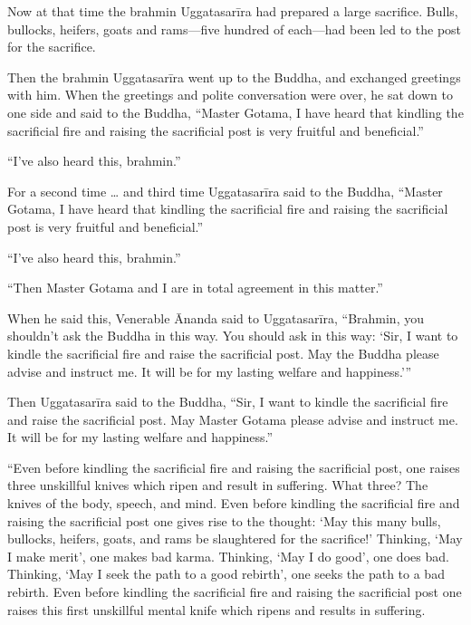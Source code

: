 \documentclass[12pt,openany]{book}%
\begin{document}
Now at that time the brahmin \textsanskrit{Uggatasarīra} had prepared a large sacrifice. Bulls, bullocks, heifers, goats and rams—five hundred of each—had been led to the post for the sacrifice. 

Then the brahmin \textsanskrit{Uggatasarīra} went up to the Buddha, and exchanged greetings with him. When the greetings and polite conversation were over, he sat down to one side and said to the Buddha, “Master Gotama, I have heard that kindling the sacrificial fire and raising the sacrificial post is very fruitful and beneficial.” 

“I’ve also heard this, brahmin.” 

For a second time … and third time \textsanskrit{Uggatasarīra} said to the Buddha, “Master Gotama, I have heard that kindling the sacrificial fire and raising the sacrificial post is very fruitful and beneficial.” 

“I’ve also heard this, brahmin.” 

“Then Master Gotama and I are in total agreement in this matter.” 

When he said this, Venerable Ānanda said to \textsanskrit{Uggatasarīra}, “Brahmin, you shouldn’t ask the Buddha in this way. You should ask in this way: ‘Sir, I want to kindle the sacrificial fire and raise the sacrificial post. May the Buddha please advise and instruct me. It will be for my lasting welfare and happiness.’” 

Then \textsanskrit{Uggatasarīra} said to the Buddha, “Sir, I want to kindle the sacrificial fire and raise the sacrificial post. May Master Gotama please advise and instruct me. It will be for my lasting welfare and happiness.” 

“Even before kindling the sacrificial fire and raising the sacrificial post, one raises three unskillful knives which ripen and result in suffering. What three? The knives of the body, speech, and mind. Even before kindling the sacrificial fire and raising the sacrificial post one gives rise to the thought: ‘May this many bulls, bullocks, heifers, goats, and rams be slaughtered for the sacrifice!’ Thinking, ‘May I make merit’, one makes bad karma. Thinking, ‘May I do good’, one does bad. Thinking, ‘May I seek the path to a good rebirth’, one seeks the path to a bad rebirth. Even before kindling the sacrificial fire and raising the sacrificial post one raises this first unskillful mental knife which ripens and results in suffering. 
\end{document}
